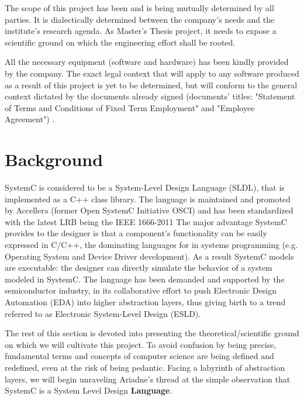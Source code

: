 \documentclass[12pt,twoside]{article}
\begin{document}
The scope of this project has been and is being mutually determined by all parties. 
It is dialectically determined between the company's needs and the institute's research agenda.
As Master's Thesis project, it needs to expose a scientific ground on which the engineering effort shall be rooted.

All the necessary equipment (software and hardware) has been kindly provided by the company.
The exact legal context that will apply to any software produced as a result of this project is yet to be determined, 
but will conform to the general context dictated by the documents already signed (documents' titles:  "Statement of Terms and Conditions of Fixed Term Employment" and "Employee Agreement") .




\section{Background}
\label{sec:orgheadline8}
SystemC is considered to be a System-Level Design Language (SLDL), that is implemented as a C++ class library.
The language is maintained and promoted by Accellera (former Open SystemC Initiative OSCI) and has been standardized with the latest LRB being the IEEE 1666-2011 \cite{OpenSystemCInitiative2012}
The major advantage SystemC provides to the designer is that a component's functionality can be easily expressed in C/C++, the dominating languages for in systems programming (e.g. Operating System and Device Driver development).
As a result SystemC models are executable: the designer can directly simulate the behavior of a system modeled in SystemC.
The language has been demanded and supported by the semiconductor industry, in its collaborative effort to push Electronic Design Automation (EDA) into higher abstraction layers, thus giving birth to a trend
referred to as Electronic System-Level Design (ESLD).

The rest of this section is devoted into presenting the theoretical/scientific ground on which we will cultivate this project.
To avoid confusion by being precise, fundamental terms and concepts of computer science are being defined and redefined, even at the risk of being pedantic.  
Facing a labyrinth of abstraction layers, we will begin unraveling Ariadne's thread at the simple observation that SystemC is a System Level Design \textbf{Language}.
\end{document}
